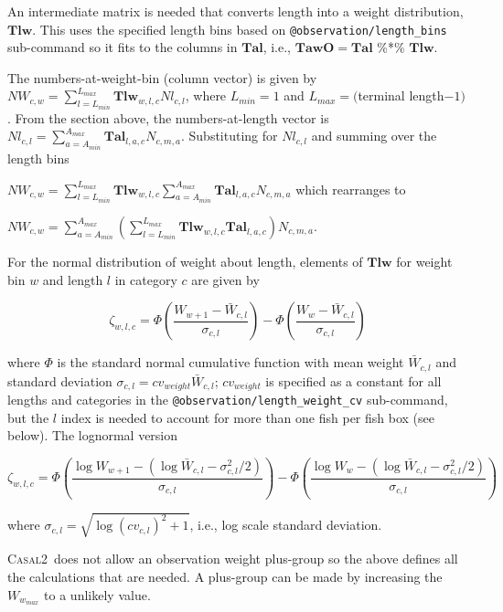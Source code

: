 \documentclass[a4paper,11pt,twoside,pdftex,draft]{article}
\newcommand{\CNAME}{\textsc{Casal2}}
\begin{document}
An intermediate matrix is needed that converts length into a weight distribution, $\mathbf{Tlw}$. This uses the specified length bins based on \texttt{@observation/length\_bins} sub-command so it fits to the columns in $\mathbf{Tal}$, i.e., $\mathbf{TawO} =\mathbf{Tal} $ \%*\% $ \mathbf{Tlw} $.

The numbers-at-weight-bin (column vector) is given by $NW_{c,w} = \sum_{l=L_{min}}^{L_{max}}  \mathbf{Tlw}_{w,l,c} Nl_{c,l}$, where $L_{min} = 1$ and $L_{max} = ($terminal length$ - 1)$ .
From the section above, the numbers-at-length vector is $Nl_{c,l} = \sum_{a=A_{min}}^{A_{max}}  \mathbf{Tal}_{l,a,c} N_{c,m,a}$. Substituting for $Nl_{c,l}$ and summing over the length bins

$NW_{c,w} = \sum_{l=L_{min}}^{L_{max}}  \mathbf{Tlw}_{w,l,c} \sum_{a=A_{min}}^{A_{max}}  \mathbf{Tal}_{l,a,c} N_{c,m,a}$ which rearranges to 

$NW_{c,w} = \sum_{a=A_{min}}^{A_{max}} \left( \sum_{l=L_{min}}^{L_{max}}  \mathbf{Tlw}_{w,l,c}  \mathbf{Tal}_{l,a,c}\right) N_{c,m,a}$. 

For the normal distribution of weight about length, 
elements of $\mathbf{Tlw}$ for weight bin $w$ and length $l$ in category $c$ are given by

\begin{equation}
\zeta_{w,l,c} = \Phi\left( \frac{W_{w+1} - \bar W_{c,l}   }{\sigma_{c,l}} \right)   - \Phi\left( \frac{W_{w} - \bar W_{c,l}   }{\sigma_{c,l}} \right)
\end{equation}

where $\Phi$ is the standard normal cumulative function with mean weight $\bar W_{c,l}$ and standard deviation $\sigma_{c,l}= cv_{weight} \bar W_{c,l}$; $cv_{weight}$ is specified as a constant for all lengths and categories  in the  \texttt{@observation/length\_weight\_cv} sub-command, but the $l$ index is needed to account for more than one fish per fish box (see below). The lognormal version

\begin{equation}
\zeta_{w,l,c} = \Phi\left( \frac{\log W_{w+1} - \left( \log\bar W_{c,l}  - \sigma_{c,l}^2/2 \right)}{\sigma_{c,l}} \right)   - \Phi\left( \frac{\log W_{w} - \left( \log\bar W_{c,l}  - \sigma_{c,l}^2/2 \right)}{\sigma_{c,l}} \right)
\end{equation}

where $\sigma_{c,l} = \sqrt{\log(cv_{c,l})^2 + 1}$, i.e., log scale standard deviation.

\CNAME~does not allow an observation weight plus-group so the above defines all the calculations that are needed. A plus-group can be made by increasing the $W_{w_{max}}$ to a unlikely value.
\end{document}
